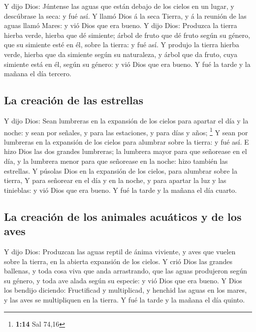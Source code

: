  Y dijo Dios: Júntense las aguas que están debajo de los
cielos en un lugar, y descúbrase la seca: y fué así.  Y
llamó Dios á la seca Tierra, y á la reunión de las aguas llamó Mares: y
vió Dios que era bueno.  Y dijo Dios: Produzca la tierra
hierba verde, hierba que dé simiente; árbol de fruto que dé fruto según
su género, que su simiente esté en él, sobre la tierra: y fué así.
 Y produjo la tierra hierba verde, hierba que da simiente
según su naturaleza, y árbol que da fruto, cuya simiente está en él,
según su género: y vió Dios que era bueno.  Y fué la tarde
y la mañana el día tercero.

\hypertarget{la-creaciuxf3n-de-las-estrellas}{%
\subsection{La creación de las
estrellas}\label{la-creaciuxf3n-de-las-estrellas}}

 Y dijo Dios: Sean lumbreras en la expansión de los cielos
para apartar el día y la noche: y sean por señales, y para las
estaciones, y para días y años; \footnote{\textbf{1:14} Sal 74,16}
 Y sean por lumbreras en la expansión de los cielos para
alumbrar sobre la tierra: y fué así.  E hizo Dios las dos
grandes lumbreras; la lumbrera mayor para que señorease en el día, y la
lumbrera menor para que señorease en la noche: hizo también las
estrellas.  Y púsolas Dios en la expansión de los cielos,
para alumbrar sobre la tierra,  Y para señorear en el día y
en la noche, y para apartar la luz y las tinieblas: y vió Dios que era
bueno.  Y fué la tarde y la mañana el día cuarto.

\hypertarget{la-creaciuxf3n-de-los-animales-acuuxe1ticos-y-de-los-aves}{%
\subsection{La creación de los animales acuáticos y de los
aves}\label{la-creaciuxf3n-de-los-animales-acuuxe1ticos-y-de-los-aves}}

 Y dijo Dios: Produzcan las aguas reptil de ánima viviente,
y aves que vuelen sobre la tierra, en la abierta expansión de los
cielos.  Y crió Dios las grandes ballenas, y toda cosa viva
que anda arrastrando, que las aguas produjeron según su género, y toda
ave alada según su especie: y vió Dios que era bueno.  Y
Dios los bendijo diciendo: Fructificad y multiplicad, y henchid las
aguas en los mares, y las aves se multipliquen en la tierra.
 Y fué la tarde y la mañana el día quinto.

